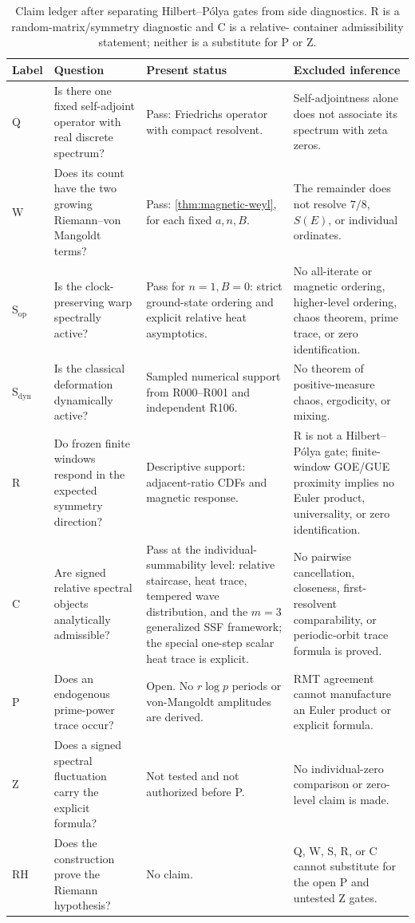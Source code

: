 \begin{table}[t]
\centering
\caption{Claim ledger after separating Hilbert--P\'olya gates from side
diagnostics.  R is a random-matrix/symmetry diagnostic and C is a relative-
container admissibility statement; neither is a substitute for P or Z.}
\label{tab:gate-ledger}
\scriptsize
\begin{tabular}{@{}p{}p{}p{}p{}@{}}
\toprule
Label & Question & Present status & Excluded inference\\
\midrule
Q & Is there one fixed self-adjoint operator with real discrete spectrum? &
Pass: Friedrichs operator with compact resolvent. &
Self-adjointness alone does not associate its spectrum with zeta zeros.\\
W & Does its count have the two growing Riemann--von Mangoldt terms? &
Pass: \cref{thm:magnetic-weyl}, for each fixed \(a,n,B\). &
The remainder does not resolve \(7/8\), \(S(E)\), or individual ordinates.\\
S\(_{\mathrm{op}}\) & Is the clock-preserving warp spectrally active? &
Pass for \(n=1,B=0\): strict ground-state ordering and explicit relative
heat asymptotics. &
No all-iterate or magnetic ordering, higher-level ordering, chaos theorem,
prime trace, or zero identification.\\
S\(_{\mathrm{dyn}}\) & Is the classical deformation dynamically active? &
Sampled numerical support from R000--R001 and independent R106. &
No theorem of positive-measure chaos, ergodicity, or mixing.\\
R & Do frozen finite windows respond in the expected symmetry direction? &
Descriptive support: adjacent-ratio CDFs and magnetic response. &
R is not a Hilbert--P\'olya gate; finite-window GOE/GUE proximity implies no
Euler product, universality, or zero identification.\\
C & Are signed relative spectral objects analytically admissible? &
Pass at the individual-summability level: relative staircase, heat trace,
tempered wave distribution, and the \(m=3\) generalized SSF framework; the
special one-step scalar heat trace is explicit. &
No pairwise cancellation, closeness, first-resolvent comparability, or
periodic-orbit trace formula is proved.\\
P & Does an endogenous prime-power trace occur? &
Open.  No \(r\log p\) periods or von-Mangoldt amplitudes are derived. &
RMT agreement cannot manufacture an Euler product or explicit formula.\\
Z & Does a signed spectral fluctuation carry the explicit formula? &
Not tested and not authorized before P. &
No individual-zero comparison or zero-level claim is made.\\
RH & Does the construction prove the Riemann hypothesis? &
No claim. &
Q, W, S, R, or C cannot substitute for the open P and untested Z gates.\\
\bottomrule
\end{tabular}
\end{table}
\FloatBarrier

